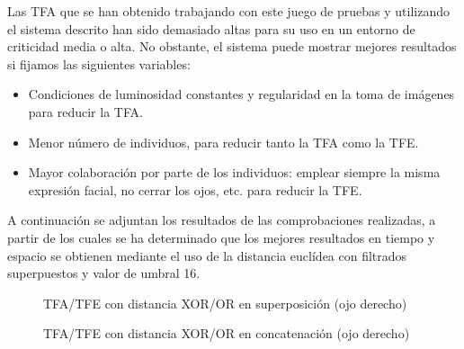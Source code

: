 Las TFA que se han obtenido trabajando con este juego de pruebas y utilizando el sistema descrito han sido demasiado altas para su uso en un entorno de criticidad media o alta. No obstante, el sistema puede mostrar mejores resultados si fijamos las siguientes variables:
\begin{itemize}
	\item{Condiciones de luminosidad constantes y regularidad en la toma de imágenes para reducir la TFA.}
	\item{Menor número de individuos, para reducir tanto la TFA como la TFE.}
	\item{Mayor colaboración por parte de los individuos: emplear siempre la misma expresión facial, no cerrar los ojos, etc. para reducir la TFE.}
\end{itemize}
A continuación se adjuntan los resultados de las comprobaciones realizadas, a partir de los cuales se ha determinado que los mejores resultados en tiempo y espacio se obtienen mediante el uso de la distancia euclídea con filtrados superpuestos y valor de umbral 16.




\clearpage




\clearpage




\clearpage

\begin{figure}[!htb]
	\centering
			\resizebox{7.25cm}{!}{}
			\resizebox{7.25cm}{!}{}
			\resizebox{7.25cm}{!}{}
			\resizebox{7.25cm}{!}{}
        \caption{TFA/TFE con distancia XOR/OR en superposición (ojo derecho)}
        \label{fig:superp-xor-od}
\end{figure}

\begin{figure}[!htb]
	\centering
			\resizebox{7.25cm}{!}{}
			\resizebox{7.25cm}{!}{}
			\resizebox{7.25cm}{!}{}
			\resizebox{7.25cm}{!}{}
        \caption{TFA/TFE con distancia XOR/OR en concatenación (ojo derecho)}
        \label{fig:concat-xor-od}
\end{figure}

